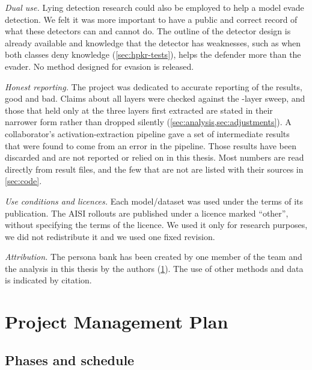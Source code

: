 \emph{Dual use.} Lying detection research could also be employed to help a model evade detection.
We felt it was more important to have a public and correct record of what these detectors can
and cannot do. The outline of the detector design is already available \cite{mahadik2026persona} and
knowledge that the detector has weaknesses, such as when both classes deny knowledge
(\cref{sec:hpkr-tests}), helps the defender more than the evader. No method designed for evasion is
released.

\emph{Honest reporting.} The project was dedicated to accurate reporting of the results, good and bad.
Claims about all layers were checked against the -layer sweep, and those that held only at
the three layers first extracted are stated in their narrower form rather than dropped silently
(\cref{sec:analysis,sec:adjustments}). A
collaborator's activation-extraction pipeline gave a set of intermediate results that were found to
come from an error in the pipeline. Those results have been discarded and are not reported or relied
on in this thesis. Most numbers are read directly from result files, and the few that are not are listed
with their sources in \cref{sec:code}.

\emph{Use conditions and licences.} Each model/dataset was used under the terms of its publication. The AISI rollouts \cite{aisi_lie_rollouts} are published under a licence
marked ``other'', without specifying the terms of the licence. We used it only for research
purposes, we did not redistribute it and we used one fixed revision.

\emph{Attribution.} The persona bank has been created by one member of the team and the analysis in
this thesis by the authors (\cref{sec:pm}).
 The use of other methods and data is indicated by
citation.


\section{Project Management Plan}
\label{sec:pm}

\subsection{Phases and schedule}

